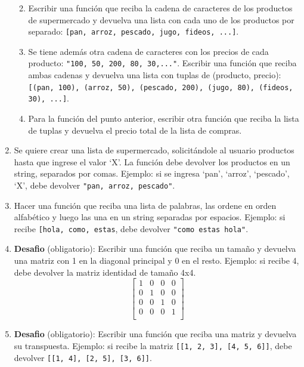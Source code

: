 \documentclass[
  letterpaper,
  DIV=11,
  numbers=noendperiod]{scrreprt}
\begin{document}
\begin{enumerate}
  \begin{enumerate}
  \def\labelenumii{\alph{enumii}.}
  \item
    Escribir una función que reciba la cadena de caracteres de los
    productos de supermercado y devuelva una lista con cada uno de los
    productos por separado:
    \texttt{{[}\textquotesingle{}pan\textquotesingle{},\ \textquotesingle{}arroz\textquotesingle{},\ \textquotesingle{}pescado\textquotesingle{},\ \textquotesingle{}jugo\textquotesingle{},\ \textquotesingle{}fideos\textquotesingle{},\ ...{]}}.
  \item
    Se tiene además otra cadena de caracteres con los precios de cada
    producto: \texttt{"100,\ 50,\ 200,\ 80,\ 30,..."}. Escribir una
    función que reciba ambas cadenas y devuelva una lista con tuplas de
    (producto, precio):
    \texttt{{[}(\textquotesingle{}pan\textquotesingle{},\ 100),\ (\textquotesingle{}arroz\textquotesingle{},\ 50),\ (\textquotesingle{}pescado\textquotesingle{},\ 200),\ (\textquotesingle{}jugo\textquotesingle{},\ 80),\ (\textquotesingle{}fideos\textquotesingle{},\ 30),\ ...{]}}.
  \item
    Para la función del punto anterior, escribir otra función que reciba
    la lista de tuplas y devuelva el precio total de la lista de
    compras.
  \end{enumerate}
\item
  Se quiere crear una lista de supermercado, solicitándole al usuario
  productos hasta que ingrese el valor `X'. La función debe devolver los
  productos en un string, separados por comas. Ejemplo: si se ingresa
  `pan', `arroz', `pescado', `X', debe devolver
  \texttt{"pan,\ arroz,\ pescado"}.
\item
  Hacer una función que reciba una lista de palabras, las ordene en
  orden alfabético y luego las una en un string separadas por espacios.
  Ejemplo: si recibe
  \texttt{{[}\textquotesingle{}hola\textquotesingle{},\ \textquotesingle{}como\textquotesingle{},\ \textquotesingle{}estas\textquotesingle{}{]}},
  debe devolver \texttt{"como\ estas\ hola"}.
\item
  \textbf{Desafio} (obligatorio): Escribir una función que reciba un
  tamaño y devuelva una matriz con 1 en la diagonal principal y 0 en el
  resto. Ejemplo: si recibe 4, debe devolver la matriz identidad de
  tamaño 4x4. \[
  \begin{bmatrix}
  1 & 0 & 0 & 0 \\
  0 & 1 & 0 & 0 \\
  0 & 0 & 1 & 0 \\
  0 & 0 & 0 & 1 \\
  \end{bmatrix}
  \]
\item
  \textbf{Desafio} (obligatorio): Escribir una función que reciba una
  matriz y devuelva su transpuesta. Ejemplo: si recibe la matriz
  \texttt{{[}{[}1,\ 2,\ 3{]},\ {[}4,\ 5,\ 6{]}{]}}, debe devolver
  \texttt{{[}{[}1,\ 4{]},\ {[}2,\ 5{]},\ {[}3,\ 6{]}{]}}.
\end{enumerate}
\end{document}
